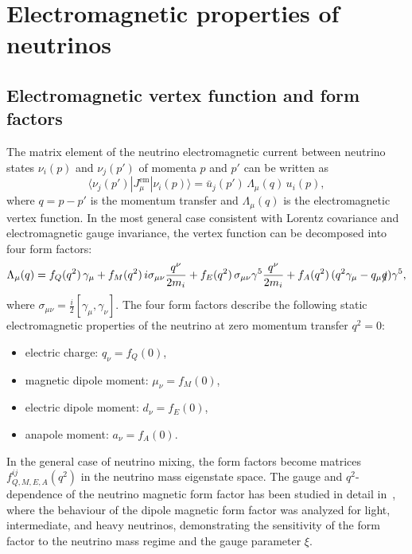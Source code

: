 \documentclass[a4paper,11pt]{article}
\begin{document}

\section{Electromagnetic properties of neutrinos}
\label{sec:emp}

\subsection{Electromagnetic vertex function and form factors}

The matrix element of the neutrino electromagnetic current between neutrino states $\nu_i(p)$ and $\nu_j(p')$ of momenta $p$ and $p'$ can be written as~\cite{Giunti:2015RMP,Dvornikov:Studenikin:2004PRD}
\begin{equation}
\label{eq:em_current}
\langle \nu_j(p') | J_\mu^{\text{em}} | \nu_i(p) \rangle = \bar{u}_j(p')\,\Lambda_\mu(q)\,u_i(p),
\end{equation}
where $q = p - p'$ is the momentum transfer and $\Lambda_\mu(q)$ is the electromagnetic vertex function. In the most general case consistent with Lorentz covariance and electromagnetic gauge invariance, the vertex function can be decomposed into four form factors:
\begin{equation}
\label{eq:vertex}
\Lambda_\mu(q) = f_Q(q^2)\,\gamma_\mu + f_M(q^2)\,i\sigma_{\mu\nu}\frac{q^\nu}{2m_i} + f_E(q^2)\,\sigma_{\mu\nu}\gamma^5\frac{q^\nu}{2m_i} + f_A(q^2)\,(q^2\gamma_\mu - q_\mu \slashed{q})\gamma^5,
\end{equation}
where $\sigma_{\mu\nu} = \frac{i}{2}[\gamma_\mu, \gamma_\nu]$. The four form factors describe the following static electromagnetic properties of the neutrino at zero momentum transfer $q^2 = 0$:
\begin{itemize}
\item electric charge: $q_\nu = f_Q(0)$,
\item magnetic dipole moment: $\mu_\nu = f_M(0)$,
\item electric dipole moment: $d_\nu = f_E(0)$,
\item anapole moment: $a_\nu = f_A(0)$.
\end{itemize}
In the general case of neutrino mixing, the form factors become matrices $f_{Q,M,E,A}^{ij}(q^2)$ in the neutrino mass eigenstate space. The gauge and $q^2$-dependence of the neutrino magnetic form factor has been studied in detail in~\cite{Dvornikov:Studenikin:2004PRD}, where the behaviour of the dipole magnetic form factor was analyzed for light, intermediate, and heavy neutrinos, demonstrating the sensitivity of the form factor to the neutrino mass regime and the gauge parameter $\xi$.
\end{document}
